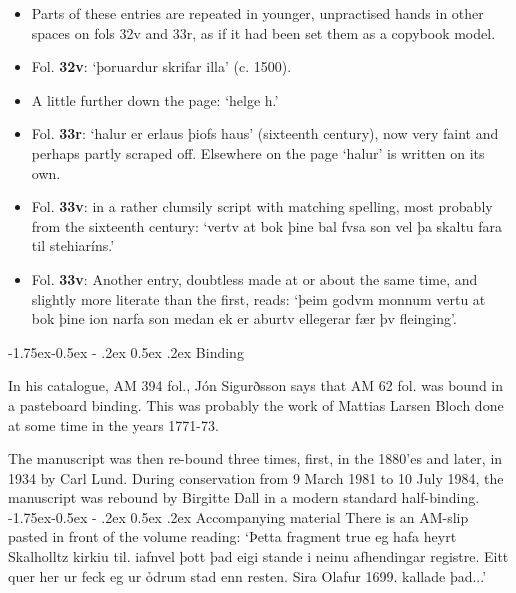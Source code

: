 \documentclass[11pt,twoside]{article}\makeatletter
\makeatletter
\def\ref{}
\renewcommand\subsection{\@startsection{subsection}{2}{\z@}%
     {-1.75ex\@plus -0.5ex \@minus- .2ex}%
     {0.5ex \@plus .2ex}%
     {\reset@font\Large\sffamily}}
\makeatother
\begin{document}
\begin{itemize}
\item Parts of these entries are repeated in younger, unpractised hands in other spaces on fols 32v and 33r, as if it had been set them as a copybook model.
\item Fol. \textbf{32v}:  ‘þoruardur skrifar illa’ (c. 1500).
\item A little further down the page: ‘helge h.’
\item Fol. \textbf{33r}:  ‘halur er erlaus þiofs haus’ (sixteenth century), now very faint and perhaps partly scraped off. Elsewhere on the page ‘halur’ is written on its own.
\item Fol. \textbf{33v}:  in a rather clumsily script with matching spelling, most probably from the sixteenth century: ‘vertv at bok þine {\hskip1pt}\newline  bal fvsa son vel þa skaltu {\hskip1pt}\newline  fara til stehiaríns.’
\item Fol. \textbf{33v}:  Another entry, doubtless made at or about the same time, and slightly more literate than the first, reads: ‘þeim godvm monnum vertu at bok þine ion narfa son medan ek {\hskip1pt}\newline  er aburtv ellegerar fær þv fleinging’.
\end{itemize} 
\subsection{Binding}
\par
In his catalogue, {\ref AM 394 fol.}, Jón Sigurðsson says that AM 62 fol. was bound in a pasteboard binding. This was probably the work of Mattias Larsen Bloch done at some time in the years 1771-73.\par
The manuscript was then re-bound three times, first, in the 1880'es and later, in 1934 by Carl Lund. During conservation from 9 March 1981 to 10 July 1984, the manuscript was rebound by Birgitte Dall in a modern standard half-binding.
\subsection{Accompanying material}
There is an AM-slip pasted in front of the volume reading: ‘Þetta fragment true eg hafa {\hskip1pt}\newline  heyrt Skalholltz kirkiu til. {\hskip1pt}\newline  iafnvel þott þad eigi stande {\hskip1pt}\newline  i neinu afhendingar registre. {\hskip1pt}\newline  Eitt quer her ur feck eg ur ỏd{\hskip1pt}\newline rum stad enn resten. {\hskip1pt}\newline  Sira Olafur 1699. kallade þad...’
\end{document}
